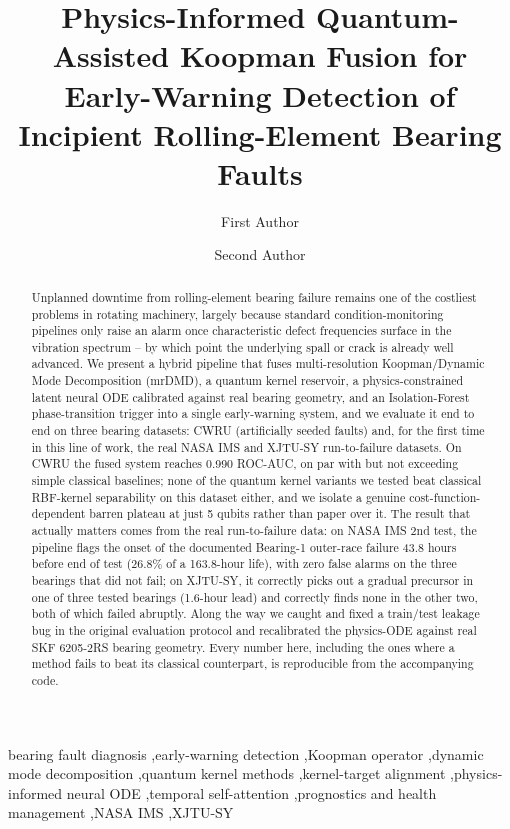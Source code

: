 \documentclass[3p,times,procedia]{elsarticle}
\begin{document}
\begin{frontmatter}


\title{Physics-Informed Quantum-Assisted Koopman Fusion for Early-Warning Detection of Incipient Rolling-Element Bearing Faults}

\author[a]{First Author}
\author[a]{Second Author}
\address[a]{Department of Mechanical / Electrical Engineering, Institution Name, City, Country}

\begin{abstract}
Unplanned downtime from rolling-element bearing failure remains one of the costliest problems in rotating machinery, largely because standard condition-monitoring pipelines only raise an alarm once characteristic defect frequencies surface in the vibration spectrum -- by which point the underlying spall or crack is already well advanced. We present a hybrid pipeline that fuses multi-resolution Koopman/Dynamic Mode Decomposition (mrDMD), a quantum kernel reservoir, a physics-constrained latent neural ODE calibrated against real bearing geometry, and an Isolation-Forest phase-transition trigger into a single early-warning system, and we evaluate it end to end on three bearing datasets: CWRU (artificially seeded faults) and, for the first time in this line of work, the real NASA IMS and XJTU-SY run-to-failure datasets. On CWRU the fused system reaches 0.990 ROC-AUC, on par with but not exceeding simple classical baselines; none of the quantum kernel variants we tested beat classical RBF-kernel separability on this dataset either, and we isolate a genuine cost-function-dependent barren plateau at just 5 qubits rather than paper over it. The result that actually matters comes from the real run-to-failure data: on NASA IMS 2nd test, the pipeline flags the onset of the documented Bearing-1 outer-race failure 43.8 hours before end of test (26.8\% of a 163.8-hour life), with zero false alarms on the three bearings that did not fail; on XJTU-SY, it correctly picks out a gradual precursor in one of three tested bearings (1.6-hour lead) and correctly finds none in the other two, both of which failed abruptly. Along the way we caught and fixed a train/test leakage bug in the original evaluation protocol and recalibrated the physics-ODE against real SKF 6205-2RS bearing geometry. Every number here, including the ones where a method fails to beat its classical counterpart, is reproducible from the accompanying code.
\end{abstract}

\begin{keyword}
bearing fault diagnosis \sep early-warning detection \sep Koopman operator \sep dynamic mode decomposition \sep quantum kernel methods \sep kernel-target alignment \sep physics-informed neural ODE \sep temporal self-attention \sep prognostics and health management \sep NASA IMS \sep XJTU-SY
\end{keyword}
\end{frontmatter}
\end{document}

